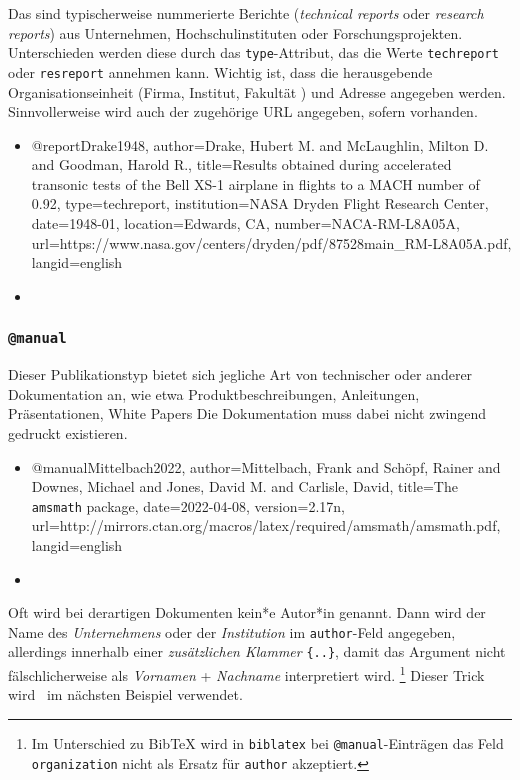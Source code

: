 Das sind typischerweise nummerierte Berichte (\emph{technical reports} oder
\emph{research reports}) aus Unternehmen, Hochschulinstituten oder
Forschungsprojekten. Unterschieden werden diese durch das
\texttt{type}-Attribut, das die Werte \texttt{techreport} oder
\texttt{resreport} annehmen kann. Wichtig ist, dass die herausgebende
Organisationseinheit (Firma, Institut, Fakultät \etc) und Adresse angegeben
werden. Sinnvollerweise wird auch der zugehörige URL angegeben, sofern
vorhanden.
%
\begin{itemize}
\item[]
\begin{GenericCode}[numbers=none]
@report{Drake1948,
  author={Drake, Hubert M. and McLaughlin, Milton D. and Goodman, Harold R.},
  title={Results obtained during accelerated transonic tests of the {Bell} {XS-1} airplane in flights to a {MACH} number of 0.92},
  type={techreport},
  institution={NASA Dryden Flight Research Center},
  date={1948-01},
  location={Edwards, CA},
  number={NACA-RM-L8A05A},
  url={https://www.nasa.gov/centers/dryden/pdf/87528main_RM-L8A05A.pdf},
  langid={english}
}
\end{GenericCode}
\item[\cite{Drake1948}] 
\end{itemize}


\subsubsection{\texttt{\bfseries @manual}}
\label{sec:@manual}

Dieser Publikationstyp bietet sich jegliche Art von technischer oder anderer
Dokumentation an, wie etwa Produktbeschreibungen, Anleitungen,
Präsentationen, White Papers \usw Die Dokumentation muss dabei nicht zwingend
gedruckt existieren.
%
\begin{itemize}
\item[]
\begin{GenericCode}[numbers=none]
@manual{Mittelbach2022,
  author={Mittelbach, Frank and Schöpf, Rainer and Downes, Michael and Jones, David M. and Carlisle, David},
  title={The \texttt{amsmath} package},
  date={2022-04-08},
  version={2.17n},
  url={http://mirrors.ctan.org/macros/latex/required/amsmath/amsmath.pdf},
  langid={english}
}
\end{GenericCode}
\item[\cite{Mittelbach2022}] 
\end{itemize}
%
Oft wird bei derartigen Dokumenten kein*e Autor*in genannt. Dann wird der
Name des \emph{Unternehmens} oder der \emph{Institution} im
\texttt{author}-Feld angegeben, allerdings innerhalb einer
\emph{zusätzlichen Klammer} \texttt{\{..\}}, damit das Argument nicht
fälschlicherweise als \emph{Vornamen} + \emph{Nachname} interpretiert wird.%
\footnote{Im Unterschied zu BibTeX wird in \texttt{biblatex} bei
\texttt{@manual}-Einträgen das Feld \texttt{organization} nicht als Ersatz
für \texttt{author} akzeptiert.} Dieser Trick wird \ua\ im nächsten Beispiel
verwendet.

